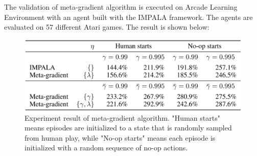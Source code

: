 \par
The validation of meta-gradient algorithm is executed on Arcade Learning Environment with an agent built with the IMPALA framework. The agents are evaluated on 57 different Atari games. The result is shown below:
\begin{figure}[H]
	\includegraphics[scale=0.3]{meta-gradient-result.png}
	\centering
	\caption{Experiment result of meta-gradient algorithm. "Human starts" means episodes are initialized to a state that is randomly sampled from human play, while "No-op starts" means each episode is initialized with a random sequence of no-op actions.}
	\label{meta-gradient-result}
\end{figure}
% 
% 
% 